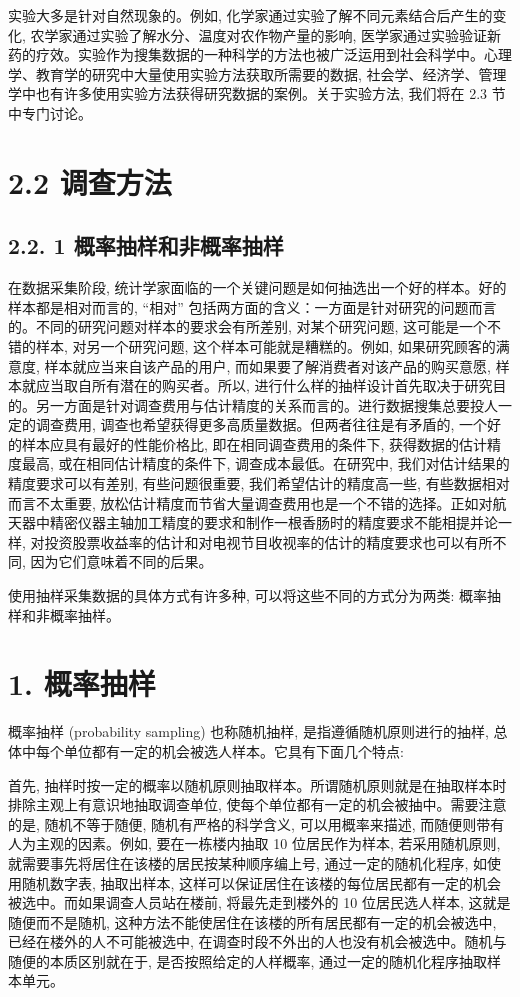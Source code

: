 \documentclass[10pt]{article}
\begin{document}
\begin{CJK*}{UTF8}{bsmi}
实验大多是针对自然现象的。例如, 化学家通过实验了解不同元素结合后产生的变化, 农学家通过实验了解水分、温度对农作物产量的影响, 医学家通过实验验证新药的疗效。实验作为搜集数据的一种科学的方法也被广泛运用到社会科学中。心理学、教育学的研究中大量使用实验方法获取所需要的数据, 社会学、经济学、管理学中也有许多使用实验方法获得研究数据的案例。关于实验方法, 我们将在 2.3 节中专门讨论。

\section*{2.2 调查方法}
\subsection*{2.2. 1 概率抽样和非概率抽样}
在数据采集阶段, 统计学家面临的一个关键问题是如何抽选出一个好的样本。好的样本都是相对而言的, “相对” 包括两方面的含义：一方面是针对研究的问题而言的。不同的研究问题对样本的要求会有所差别, 对某个研究问题, 这可能是一个不错的样本, 对另一个研究问题, 这个样本可能就是糟糕的。例如, 如果研究顾客的满意度, 样本就应当来自该产品的用户, 而如果要了解消费者对该产品的购买意愿, 样本就应当取自所有潜在的购买者。所以, 进行什么样的抽样设计首先取决于研究目的。另一方面是针对调查费用与估计精度的关系而言的。进行数据搜集总要投人一定的调查费用, 调查也希望获得更多高质量数据。但两者往往是有矛盾的, 一个好的样本应具有最好的性能价格比, 即在相同调查费用的条件下, 获得数据的估计精度最高, 或在相同估计精度的条件下, 调查成本最低。在研究中, 我们对估计结果的精度要求可以有差别, 有些问题很重要, 我们希望估计的精度高一些, 有些数据相对而言不太重要, 放松估计精度而节省大量调查费用也是一个不错的选择。正如对航天器中精密仪器主轴加工精度的要求和制作一根香肠时的精度要求不能相提并论一样, 对投资股票收益率的估计和对电视节目收视率的估计的精度要求也可以有所不同, 因为它们意味着不同的后果。

使用抽样采集数据的具体方式有许多种, 可以将这些不同的方式分为两类: 概率抽样和非概率抽样。

\section*{1. 概率抽样}
概率抽样 (probability sampling) 也称随机抽样, 是指遵循随机原则进行的抽样, 总体中每个单位都有一定的机会被选人样本。它具有下面几个特点:

首先, 抽样时按一定的概率以随机原则抽取样本。所谓随机原则就是在抽取样本时排除主观上有意识地抽取调查单位, 使每个单位都有一定的机会被抽中。需要注意的是, 随机不等于随便, 随机有严格的科学含义, 可以用概率来描述, 而随便则带有人为主观的因素。例如, 要在一栋楼内抽取 10 位居民作为样本, 若采用随机原则, 就需要事先将居住在该楼的居民按某种顺序编上号, 通过一定的随机化程序, 如使用随机数字表, 抽取出样本, 这样可以保证居住在该楼的每位居民都有一定的机会被选中。而如果调查人员站在楼前, 将最先走到楼外的 10 位居民选人样本, 这就是随便而不是随机, 这种方法不能使居住在该楼的所有居民都有一定的机会被选中, 已经在楼外的人不可能被选中, 在调查时段不外出的人也没有机会被选中。随机与随便的本质区别就在于, 是否按照给定的人样概率, 通过一定的随机化程序抽取样本单元。


\end{CJK*}
\end{document}
